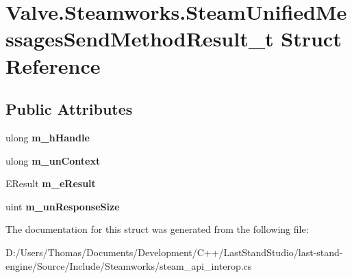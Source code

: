 \hypertarget{structValve_1_1Steamworks_1_1SteamUnifiedMessagesSendMethodResult__t}{}\section{Valve.\+Steamworks.\+Steam\+Unified\+Messages\+Send\+Method\+Result\+\_\+t Struct Reference}
\label{structValve_1_1Steamworks_1_1SteamUnifiedMessagesSendMethodResult__t}
\subsection*{Public Attributes}
\begin{DoxyCompactItemize}
\item 
\hypertarget{structValve_1_1Steamworks_1_1SteamUnifiedMessagesSendMethodResult__t_aed66e43e4abba574f6e1076f2a3f59ae}{}ulong {\bfseries m\+\_\+h\+Handle}\label{structValve_1_1Steamworks_1_1SteamUnifiedMessagesSendMethodResult__t_aed66e43e4abba574f6e1076f2a3f59ae}

\item 
\hypertarget{structValve_1_1Steamworks_1_1SteamUnifiedMessagesSendMethodResult__t_acacb85dc58fabff73f17ceba8de97135}{}ulong {\bfseries m\+\_\+un\+Context}\label{structValve_1_1Steamworks_1_1SteamUnifiedMessagesSendMethodResult__t_acacb85dc58fabff73f17ceba8de97135}

\item 
\hypertarget{structValve_1_1Steamworks_1_1SteamUnifiedMessagesSendMethodResult__t_a29ae66d6551e8b4798f39cd79f4f5304}{}E\+Result {\bfseries m\+\_\+e\+Result}\label{structValve_1_1Steamworks_1_1SteamUnifiedMessagesSendMethodResult__t_a29ae66d6551e8b4798f39cd79f4f5304}

\item 
\hypertarget{structValve_1_1Steamworks_1_1SteamUnifiedMessagesSendMethodResult__t_a966740fda5b072f3ad6232741e70170b}{}uint {\bfseries m\+\_\+un\+Response\+Size}\label{structValve_1_1Steamworks_1_1SteamUnifiedMessagesSendMethodResult__t_a966740fda5b072f3ad6232741e70170b}

\end{DoxyCompactItemize}


The documentation for this struct was generated from the following file\+:\begin{DoxyCompactItemize}
\item 
D\+:/\+Users/\+Thomas/\+Documents/\+Development/\+C++/\+Last\+Stand\+Studio/last-\/stand-\/engine/\+Source/\+Include/\+Steamworks/steam\+\_\+api\+\_\+interop.\+cs\end{DoxyCompactItemize}
